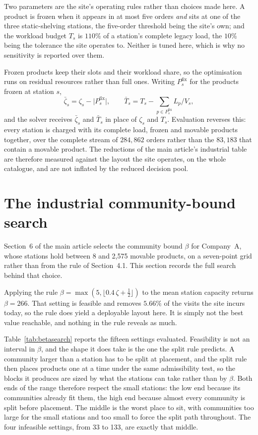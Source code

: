 \documentclass[11pt]{article}
\begin{document}
Two parameters are the site's operating rules rather than choices made here. A product is frozen
when it appears in at most five orders \emph{and} sits at one of the three static-shelving
stations, the five-order threshold being the site's own; and the workload budget $T_s$ is $110\%$
of a station's complete legacy load, the $10\%$ being the tolerance the site operates to. Neither
is tuned here, which is why no sensitivity is reported over them.

Frozen products keep their slots and their workload share, so the optimisation runs on residual
resources rather than full ones. Writing $P^{\mathrm{fix}}_s$ for the products frozen at station
$s$,
\[
\bar\zeta_s=\zeta_s-\lvert P^{\mathrm{fix}}_s\rvert,
\qquad
\bar T_s = T_s - \sum_{p \in P^{\mathrm{fix}}_s} L_p/V_s,
\]
and the solver receives $\bar\zeta_s$ and $\bar T_s$ in place of $\zeta_s$ and $T_s$. Evaluation
reverses this: every station is charged with its complete load, frozen and movable products
together, over the complete stream of $284{,}862$ orders rather than the $83{,}183$ that contain a
movable product. The reductions of the main article's industrial table are therefore measured
against the layout the site operates, on the whole catalogue, and are not inflated by the reduced
decision pool.

\section{The industrial community-bound search}\label{sup:betasearch}
Section~6 of the main article selects the community bound $\beta$ for Company~A, whose stations
hold between 8 and 2{,}575 movable products, on a seven-point grid rather than from the rule of
Section~4.1. This section records the full search behind that choice.

Applying the rule $\beta=\max(5,\lfloor 0.4\,\zeta+\tfrac12\rfloor)$ to the mean station capacity
returns $\beta=266$. That setting is feasible and removes $5.66\%$ of the visits the site incurs
today, so the rule does yield a deployable layout here. It is simply not the best value reachable,
and nothing in the rule reveals as much.

Table~\ref{tab:betasearch} reports the fifteen settings evaluated. Feasibility is not an interval
in $\beta$, and the shape it does take is the one the split rule predicts. A community larger than
a station has to be split at placement, and the split rule then places products one at a time under
the same admissibility test, so the blocks it produces are sized by what the stations can take
rather than by $\beta$. Both ends of the range therefore respect the small stations: the low end
because its communities already fit them, the high end because almost every community is split
before placement. The middle is the worst place to sit, with communities too large for the small
stations and too small to force the split path throughout. The four infeasible settings, from 33 to
133, are exactly that middle.
\end{document}
